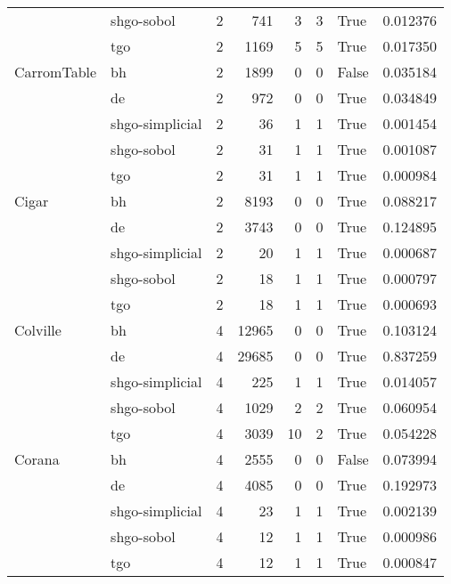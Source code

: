 \begin{longtable}{llrrrrlr}
         & shgo-sobol &     2 &      741 &      3 &       3 &    True &    0.012376 \\
         & tgo &     2 &     1169 &      5 &       5 &    True &    0.017350 \\
CarromTable & bh &     2 &     1899 &      0 &       0 &   False &    0.035184 \\
         & de &     2 &      972 &      0 &       0 &    True &    0.034849 \\
         & shgo-simplicial &     2 &       36 &      1 &       1 &    True &    0.001454 \\
         & shgo-sobol &     2 &       31 &      1 &       1 &    True &    0.001087 \\
         & tgo &     2 &       31 &      1 &       1 &    True &    0.000984 \\
Cigar & bh &     2 &     8193 &      0 &       0 &    True &    0.088217 \\
         & de &     2 &     3743 &      0 &       0 &    True &    0.124895 \\
         & shgo-simplicial &     2 &       20 &      1 &       1 &    True &    0.000687 \\
         & shgo-sobol &     2 &       18 &      1 &       1 &    True &    0.000797 \\
         & tgo &     2 &       18 &      1 &       1 &    True &    0.000693 \\
Colville & bh &     4 &    12965 &      0 &       0 &    True &    0.103124 \\
         & de &     4 &    29685 &      0 &       0 &    True &    0.837259 \\
         & shgo-simplicial &     4 &      225 &      1 &       1 &    True &    0.014057 \\
         & shgo-sobol &     4 &     1029 &      2 &       2 &    True &    0.060954 \\
         & tgo &     4 &     3039 &     10 &       2 &    True &    0.054228 \\
Corana & bh &     4 &     2555 &      0 &       0 &   False &    0.073994 \\
         & de &     4 &     4085 &      0 &       0 &    True &    0.192973 \\
         & shgo-simplicial &     4 &       23 &      1 &       1 &    True &    0.002139 \\
         & shgo-sobol &     4 &       12 &      1 &       1 &    True &    0.000986 \\
         & tgo &     4 &       12 &      1 &       1 &    True &    0.000847 \\

\end{longtable}
